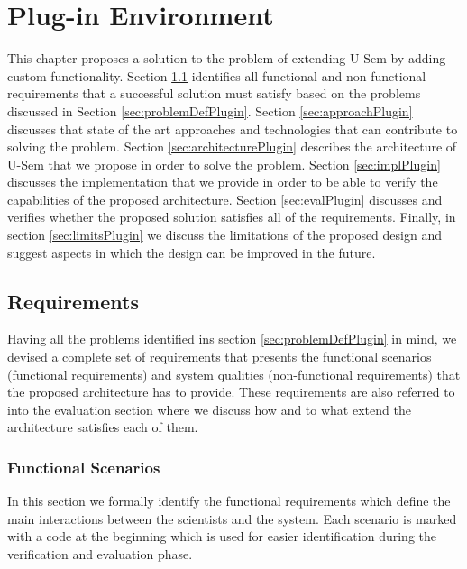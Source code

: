 
\chapter{Plug-in Environment}

This chapter proposes a solution to the problem of extending U-Sem by adding custom functionality. Section \ref{sec:requirementsPlugin} identifies all functional and non-functional requirements that a successful solution must satisfy based on the problems discussed in Section \ref{sec:problemDefPlugin}. Section \ref{sec:approachPlugin} discusses that state of the art approaches and technologies that  can contribute to solving the problem. Section \ref{sec:architecturePlugin} describes the architecture of U-Sem that we propose in order to solve the problem. Section \ref{sec:implPlugin} discusses the implementation that we provide in order to be able to verify the capabilities of the proposed architecture. Section \ref{sec:evalPlugin} discusses and verifies whether the proposed solution satisfies all of the requirements. Finally, in section \ref{sec:limitsPlugin} we discuss the limitations of the proposed design and suggest aspects in which the design can be improved in the future.


\section{Requirements}
\label{sec:requirementsPlugin}

Having all the problems identified ins section \ref{sec:problemDefPlugin} in mind, we devised a complete set of requirements that presents the functional scenarios (functional requirements) and system qualities (non-functional requirements) that the proposed architecture has to provide. These requirements are also referred to into the evaluation section where we discuss how and to what extend the architecture satisfies each of them.

\subsection{Functional Scenarios}
In this section we formally identify the functional requirements which define the main interactions between the scientists and the system. Each scenario is marked with a code at the beginning which is used for easier identification during the verification and evaluation phase.


